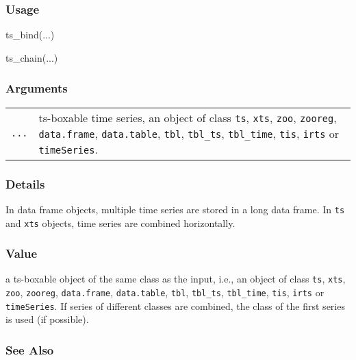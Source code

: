 \documentclass[
  letterpaper,
  DIV=11,
  numbers=noendperiod]{scrreport}
\newenvironment{Shaded}{\begin{snugshade}}{\end{snugshade}}
\newcommand{\FunctionTok}[1]{\textcolor[rgb]{0.28,0.35,0.67}{#1}}
\newcommand{\NormalTok}[1]{\textcolor[rgb]{0.00,0.23,0.31}{#1}}
\begin{document}
\subsubsection{Usage}\label{usage-34}

\begin{Shaded}
\begin{Highlighting}[]
\FunctionTok{ts\_bind}\NormalTok{(...)}

\FunctionTok{ts\_chain}\NormalTok{(...)}
\end{Highlighting}
\end{Shaded}

\subsubsection{Arguments}\label{arguments-34}

\begin{longtable}[]{@{}ll@{}}
\toprule\noalign{}
\endhead
\bottomrule\noalign{}
\endlastfoot
\texttt{...} & ts-boxable time series, an object of class \texttt{ts},
\texttt{xts}, \texttt{zoo}, \texttt{zooreg}, \texttt{data.frame},
\texttt{data.table}, \texttt{tbl}, \texttt{tbl\_ts}, \texttt{tbl\_time},
\texttt{tis}, \texttt{irts} or \texttt{timeSeries}. \\
\end{longtable}

\subsubsection{Details}\label{details-12}

In data frame objects, multiple time series are stored in a long data
frame. In \texttt{ts} and \texttt{xts} objects, time series are combined
horizontally.

\subsubsection{Value}\label{value-34}

a ts-boxable object of the same class as the input, i.e., an object of
class \texttt{ts}, \texttt{xts}, \texttt{zoo}, \texttt{zooreg},
\texttt{data.frame}, \texttt{data.table}, \texttt{tbl},
\texttt{tbl\_ts}, \texttt{tbl\_time}, \texttt{tis}, \texttt{irts} or
\texttt{timeSeries}. If series of different classes are combined, the
class of the first series is used (if possible).

\subsubsection{See Also}\label{see-also-1}
\end{document}
